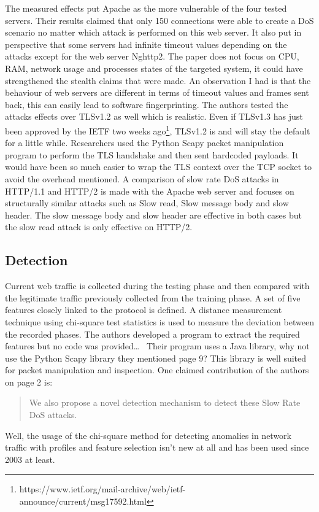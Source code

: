 \documentclass[11pt, a4paper]{article}
\begin{document}
The measured effects put Apache as the more vulnerable of the four tested servers.
Their results claimed that only 150 connections were able to create a DoS scenario no matter which attack is performed on this web server.
It also put in perspective that some servers had infinite timeout values depending on the attacks except for the web server Nghttp2.
The paper does not focus on CPU, RAM, network usage and processes states of the targeted system, it could have strengthened the stealth claims that were made.
An observation I had is that the behaviour of web servers are different in terms of timeout values and frames sent back, this can easily lead to software fingerprinting.
The authors tested the attacks effects over TLSv1.2 as well which is realistic.
Even if TLSv1.3 has just been approved by the IETF two weeks ago\footnote{https://www.ietf.org/mail-archive/web/ietf-announce/current/msg17592.html}, TLSv1.2 is and will stay the default for a little while.
Researchers used the Python Scapy packet manipulation program to perform the TLS handshake and then sent hardcoded payloads.
It would have been so much easier to wrap the TLS context over the TCP socket to avoid the overhead mentioned.
A comparison of slow rate DoS attacks in HTTP/1.1 and HTTP/2 is made with the Apache web server and focuses on structurally similar attacks such as Slow read, Slow message body and slow header.
The slow message body and slow header are effective in both cases but the slow read attack is only effective on HTTP/2.

\subsection{Detection}

Current web traffic is collected during the testing phase and then compared with the legitimate traffic previously collected from the training phase.
A set of five features closely linked to the protocol is defined.
A distance measurement technique using chi-square test statistics is used to measure the deviation between the recorded phases.
The authors developed a program to extract the required features but no code was provided\ldots~
Their program uses a Java library, why not use the Python Scapy library they mentioned page 9?
This library is well suited for packet manipulation and inspection.
One claimed contribution of the authors on page 2 is:
\begin{quote}
	We also propose a novel detection mechanism to detect these Slow Rate DoS attacks.
\end{quote}
Well, the usage of the chi-square method for detecting anomalies in network traffic with profiles and feature selection isn't new at all \cite{Feinstein:2003} and has been used since 2003 at least.
\end{document}
